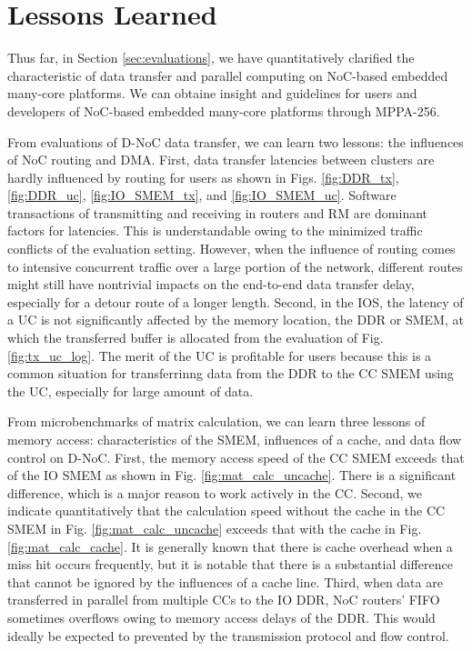 \section{Lessons Learned}
\label{sec:lessons}
Thus far, in Section \ref{sec:evaluations}, we have quantitatively clarified the characteristic of data transfer and parallel computing on NoC-based embedded many-core platforms.
We can obtaine insight and guidelines for users and developers of NoC-based embedded many-core platforms through MPPA-256.

From evaluations of D-NoC data transfer, we can learn two lessons: the influences of NoC routing and DMA.
First, data transfer latencies between clusters are hardly influenced by routing for users as shown in Figs. \ref{fig:DDR_tx}, \ref{fig:DDR_uc}, \ref{fig:IO_SMEM_tx}, and \ref{fig:IO_SMEM_uc}.
Software transactions of transmitting and receiving in routers and RM are dominant factors for latencies.
This is understandable owing to the minimized traffic conflicts of the evaluation setting.
However, when the influence of routing comes to intensive concurrent traffic over a large portion of the network, different routes might still have nontrivial impacts on the end-to-end data transfer delay, especially for a detour route of a longer length.
Second, in the IOS, the latency of a UC is not significantly affected by the memory location, the DDR or SMEM, at which the transferred buffer is allocated from the evaluation of Fig. \ref{fig:tx_uc_log}.
The merit of the UC is profitable for users because this is a common situation for transferrinng data from the DDR to the CC SMEM using the UC, especially for large amount of data.

From microbenchmarks of matrix calculation, we can learn three lessons of memory access: characteristics of the SMEM, influences of a cache, and data flow control on D-NoC.
First, the memory access speed of the CC SMEM exceeds that of the IO SMEM as shown in Fig. \ref{fig:mat_calc_uncache}.
There is a significant difference, which is a major reason to work actively in the CC.
Second, we indicate quantitatively that the calculation speed without the cache in the CC SMEM in Fig. \ref{fig:mat_calc_uncache} exceeds that with the cache in Fig. \ref{fig:mat_calc_cache}.
It is generally known that there is cache overhead when a miss hit occurs frequently, but it is notable that there is a substantial difference that cannot be ignored by the influences of a cache line.
Third, when data are transferred in parallel from multiple CCs to the IO DDR, NoC routers' FIFO sometimes overflows owing to memory access delays of the DDR.
This would ideally be expected to prevented by the transmission protocol and flow control.

